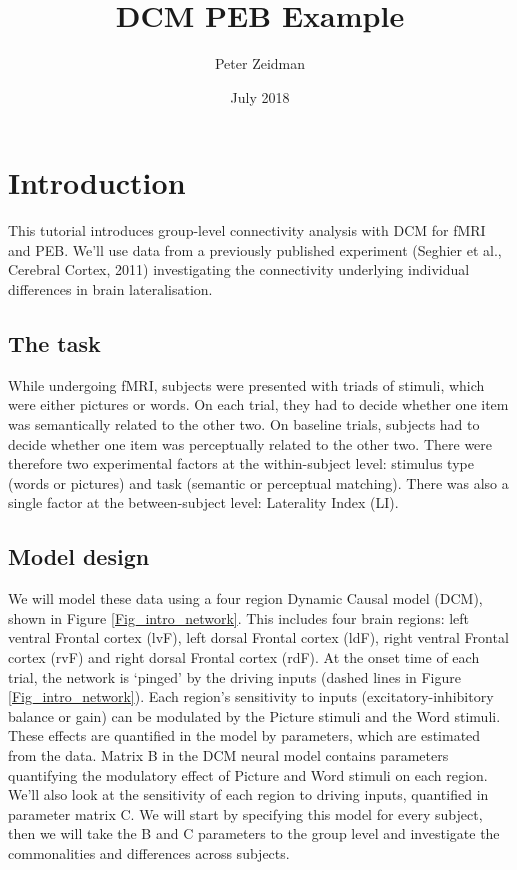 \documentclass{article}
\title{DCM PEB Example}
\author{Peter Zeidman}
\date{July 2018}
\begin{document}
\maketitle

\tableofcontents

\section{Introduction}
This tutorial introduces group-level connectivity analysis with DCM for fMRI and PEB. We'll use data from a previously published experiment (Seghier et al., Cerebral Cortex, 2011) investigating the connectivity underlying individual differences in brain lateralisation. 

\subsection{The task}
While undergoing fMRI, subjects were presented with triads of stimuli, which were either pictures or words. On each trial, they had to decide whether one item was semantically related to the other two. On baseline trials, subjects had to decide whether one item was perceptually related to the other two. There were therefore two experimental factors at the within-subject level: stimulus type (words or pictures) and task (semantic or perceptual matching). There was also a single factor at the between-subject level: Laterality Index (LI). 

\subsection{Model design}
We will model these data using a four region Dynamic Causal model (DCM), shown in Figure \ref{Fig_intro_network}. This includes four brain regions: left ventral Frontal cortex (lvF), left dorsal Frontal cortex (ldF), right ventral Frontal cortex (rvF) and right dorsal Frontal cortex (rdF). At the onset time of each trial, the network is `pinged' by the driving inputs (dashed lines in Figure \ref{Fig_intro_network}). Each region's sensitivity to inputs (excitatory-inhibitory balance or gain) can be modulated by the Picture stimuli and the Word stimuli. These effects are quantified in the model by parameters, which are estimated from the data. Matrix B in the DCM neural model contains parameters quantifying the modulatory effect of Picture and Word stimuli on each region. We'll also look at the sensitivity of each region to driving inputs, quantified in parameter matrix C. We will start by specifying this model for every subject, then we will take the B and C parameters to the group level and investigate the commonalities and differences across subjects.
\end{document}
